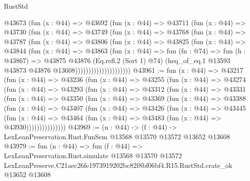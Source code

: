 \begin{lexlean}{RustStd}
\begin{coremodule}
                    @43673
                      (fun (x : @44) =>
                      @43692
                        (fun (x : @44) =>
                        @43711
                          (fun (x : @44) =>
                          @43730
                            (fun (x : @44) =>
                            @43749
                              (fun (x : @44) =>
                              @43768
                                (fun (x : @44) =>
                                @43787
                                  (fun (x : @44) =>
                                  @43806
                                    (fun (x : @44) =>
                                    @43825
                                      (fun (x : @44) =>
                                      @43844
                                        (fun (x : @44) =>
                                        @43863
                                          (fun (x : @44) =>
                                          fun (fn : @74) =>
                                          fun (h : @43867) =>
                                          @43875
                                            @43876
                                            (Eq.refl.{2} (Sort 1) @74)
                                            (heq_of_eq.{1}
                                              @13593
                                              @43873
                                              @43876
                                              @13608)))))))))))))))))))))
@43961 := fun (x : @44) =>
  @43217
    (fun (x : @44) =>
    @43236
      (fun (x : @44) =>
      @43255
        (fun (x : @44) =>
        @43274
          (fun (x : @44) =>
          @43293
            (fun (x : @44) =>
            @43312
              (fun (x : @44) =>
              @43331
                (fun (x : @44) =>
                @43350
                  (fun (x : @44) =>
                  @43369
                    (fun (x : @44) =>
                    @43388
                      (fun (x : @44) =>
                      @43407
                        (fun (x : @44) =>
                        @43426
                          (fun (x : @44) =>
                          @43445
                            (fun (x : @44) =>
                            @43464 (fun (x : @44) => @43483 (fun (x : @44) => @43930)))))))))))))))
@43969 := (n : @44) ->
  (f : @44) -> LexLeanPreservation.Rust.FunSem @13568 @13570 @13572 @13652 @13608
@43979 := fun (n : @44) =>
  fun (f : @44) =>
  LexLeanPreservation.Rust.simulate
    @13568
    @13570
    @13572
    LexLeanPreserve.C21aec26fe1973919202bc82f8bf06bf4.R15.RustStd.crate_ok
    @13652
    @13608
\end{coremodule}
\end{lexlean}
